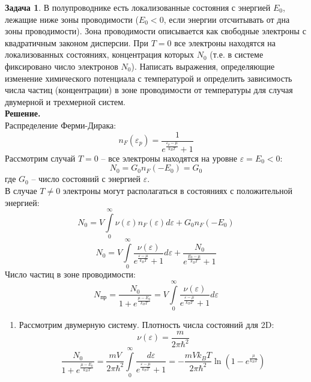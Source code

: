 \documentclass[12pt]{article}
\theoremstyle{definition}
\newtheorem{zad}{Задача}[section]
\begin{document}
\begin{zad}
В полупроводнике есть локализованные состояния с энергией $E_0$, лежащие ниже зоны проводимости ($E_0<0$, если энергии отсчитывать от дна зоны проводимости). Зона проводимости описывается как свободные электроны с квадратичным законом дисперсии. При $T=0$ все электроны находятся на локализованных состояниях, концентрация которых $N_0$ (т.е. в системе фиксировано число электронов $N_0$). Написать выражения, определяющие изменение химического потенциала с температурой и определить зависимость числа частиц (концентрации) в зоне проводимости от температуры для случая двумерной и трехмерной систем.\\
\textbf{Решение.}\\
Распределение Ферми-Дирака:
\begin{equation}
    n_F(\varepsilon_p)=\frac{1}{e^{\frac{\varepsilon_p-\mu}{k_BT}}+1}
\end{equation}
Рассмотрим случай $T=0$ -- все электроны находятся на уровне $\varepsilon=E_0<0$:
\begin{equation}
    N_0=G_0n_F(-E_0)=G_0
\end{equation}
где $G_0$ -- число состояний с энергией $\varepsilon$.\\
В случае $T\neq0$ электроны могут располагаться в состояниях с положительной энергией:
\begin{equation}    
    N_0=V\int\limits_0^\infty\nu(\varepsilon)n_F(\varepsilon)d\varepsilon+G_0n_F(-E_0)
\end{equation}
\begin{equation}
    N_0=V\int\limits_0^\infty\frac{\nu(\varepsilon)}{e^{\frac{\varepsilon-\mu}{k_BT}}+1}d\varepsilon+\frac{N_0}{e^{{\frac{E_0-\mu}{k_BT}}}+1}
\end{equation}
Число частиц в зоне проводимости:
\begin{equation}
    N_\text{пр}=\frac{N_0}{1+e^{\frac{\mu-E_0}{k_BT}}}=V\int\limits_0^\infty\frac{\nu(\varepsilon)}{e^{\frac{\varepsilon-\mu}{k_BT}}+1}d\varepsilon
\end{equation}
\begin{enumerate}
    \item Рассмотрим двумерную систему. Плотность числа состояний для 2D:
    \begin{equation}
        \nu(\varepsilon)=\frac{m}{2\pi\hbar^2}
    \end{equation}
    \begin{equation}
        \frac{N_0}{1+e^{\frac{\mu-E_0}{k_BT}}}=\frac{mV}{2\pi\hbar^2}\int\limits_0^\infty\frac{d\varepsilon}{e^{\frac{\varepsilon-\mu}{k_BT}}+1}=-\frac{mVk_BT}{2\pi\hbar^2}\ln\left(1-e^\frac{\mu}{k_BT}\right)

\end{equation}
\end{enumerate}
\end{zad}
\end{document}

